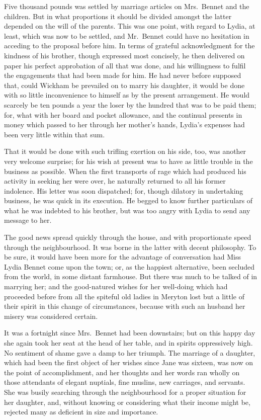 \documentclass[12pt,english,oneside]{book}
\begin{document}
Five thousand pounds was settled by marriage articles on Mrs.\ Bennet
and the children. But in what proportions it should be divided amongst
the latter depended on the will of the parents. This was one point,
with regard to Lydia, at least, which was now to be settled, and Mr.\ Bennet
could have no hesitation in acceding to the proposal before him. In
terms of grateful acknowledgment for the kindness of his brother,
though expressed most concisely, he then delivered on paper his perfect
approbation of all that was done, and his willingness to fulfil the
engagements that had been made for him. He had never before supposed
that, could Wickham be prevailed on to marry his daughter, it would
be done with so little inconvenience to himself as by the present
arrangement. He would scarcely be ten pounds a year the loser by the
hundred that was to be paid them; for, what with her board and pocket
allowance, and the continual presents in money which passed to her
through her mother's hands, Lydia's expenses had been very little
within that sum.

That it would be done with such trifling exertion on his side, too,
was another very welcome surprise; for his wish at present was to
have as little trouble in the business as possible. When the first
transports of rage which had produced his activity in seeking her
were over, he naturally returned to all his former indolence. His
letter was soon dispatched; for, though dilatory in undertaking business,
he was quick in its execution. He begged to know further particulars
of what he was indebted to his brother, but was too angry with Lydia
to send any message to her.

The good news spread quickly through the house, and with proportionate
speed through the neighbourhood. It was borne in the latter with decent
philosophy. To be sure, it would have been more for the advantage
of conversation had Miss Lydia Bennet come upon the town; or, as the
happiest alternative, been secluded from the world, in some distant
farmhouse. But there was much to be talked of in marrying her; and
the good-natured wishes for her well-doing which had proceeded before
from all the spiteful old ladies in Meryton lost but a little of their
spirit in this change of circumstances, because with such an husband
her misery was considered certain.

It was a fortnight since Mrs.\ Bennet had been downstairs; but on
this happy day she again took her seat at the head of her table, and
in spirits oppressively high. No sentiment of shame gave a damp to
her triumph. The marriage of a daughter, which had been the first
object of her wishes since Jane was sixteen, was now on the point
of accomplishment, and her thoughts and her words ran wholly on those
attendants of elegant nuptials, fine muslins, new carriages, and servants.
She was busily searching through the neighbourhood for a proper situation
for her daughter, and, without knowing or considering what their income
might be, rejected many as deficient in size and importance.
\end{document}
